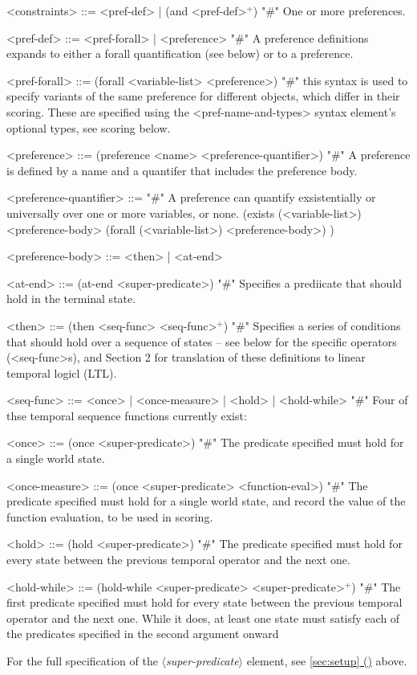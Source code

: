 \documentclass{article}
\newcommand{\dsl}[1]{{\it $\langle$#1$\rangle$}}
\newcommand*{\fullref}[1]{\hyperref[{#1}]{\autoref*{#1} (\nameref*{#1})}} %
\begin{document}
\begin{grammar}
<constraints> ::= <pref-def> | (and <pref-def>$^+$)  "#" One or more preferences.
    
<pref-def> ::= <pref-forall> | <preference> "#" A preference definitions expands to either a forall quantification (see below) or to a preference.

<pref-forall> ::= (forall <variable-list> <preference>) "#" this syntax is used to specify variants of the same preference for different objects, which differ in their scoring. These are specified using the <pref-name-and-types> syntax element's optional types, see scoring below.
    
<preference> ::= (preference <name> <preference-quantifier>) "#" A preference is defined by a name and a quantifer that includes the preference body.

<preference-quantifier> ::= "#" A preference can quantify exsistentially or universally over one or more variables, or none. 
\alt (exists (<variable-list>) <preference-body> 
\alt  (forall (<variable-list>) <preference-body>)
) 

<preference-body> ::=  <then> | <at-end>

<at-end> ::= (at-end <super-predicate>) "#" Specifies a prediicate that should hold in the terminal state.

<then> ::= (then <seq-func> <seq-func>$^+$) "#" Specifies a series of conditions that should hold over a sequence of states -- see below for the specific operators (<seq-func>s), and Section 2 for translation of these definitions to linear temporal logicl (LTL).

<seq-func> ::= <once> | <once-measure> | <hold> | <hold-while> "#" Four of thse temporal sequence functions currently exist: 

<once> ::= (once <super-predicate>) "#" The predicate specified must hold for a single world state.

<once-measure> ::= (once <super-predicate> <function-eval>) "#" The predicate specified must hold for a single world state, and record the value of the function evaluation, to be used in scoring.

<hold> ::= (hold <super-predicate>) "#" The predicate specified must hold for every state between the previous temporal operator and the next one.

<hold-while> ::= (hold-while <super-predicate> <super-predicate>$^+$) "#" The first predicate specified must hold for every state between the previous temporal operator and the next one. While it does, at least one state must satisfy each of the predicates specified in the second argument onward



\end{grammar}
For the full specification of the \dsl{super-predicate} element, see \fullref{sec:setup} above.
        
\end{document}
